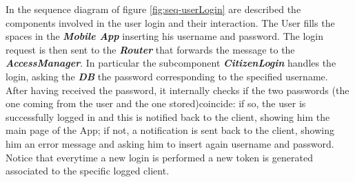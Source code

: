 \documentclass[a4paper]{report}
\begin{document}
In the sequence diagram of figure \ref{fig:seq-userLogin} are described the components involved in the user login and their interaction. The User fills the spaces in the \textbf{\textit{Mobile App}} inserting his username and password. The login request is then sent to the \textbf{\textit{Router}} that forwards the message to the \textbf{\textit{AccessManager}}. In particular the subcomponent \textbf{\textit{CitizenLogin}}  handles the login, asking the \textbf{\textit{DB}} the password corresponding to the specified username. After having received the password, it internally checks if  the two passwords (the one coming from the user and the one stored)coincide: if so, the user is successfully logged in and this is notified back to the client, showing him the main page of the App; if not, a notification is sent back to the client, showing him an error message and asking him to insert again username and password. Notice that everytime a new login is performed a new token is generated associated to the specific logged client.
\\\\
\end{document}

